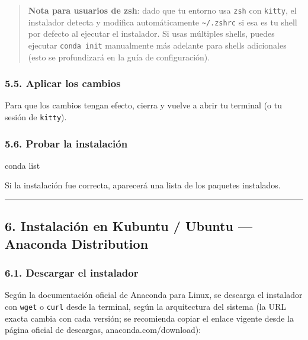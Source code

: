 \documentclass[
  doc,
  floatsintext,
  longtable,
  a4paper,
  nolmodern,
  notxfonts,
  notimes,
  12pt,
  colorlinks=true,linkcolor=blue,citecolor=blue,urlcolor=blue]{apa7}
\newenvironment{Shaded}{\begin{snugshade}}{\end{snugshade}}
\newcommand{\ExtensionTok}[1]{\textcolor[rgb]{0.00,0.23,0.31}{#1}}
\newcommand{\NormalTok}[1]{\textcolor[rgb]{0.00,0.23,0.31}{#1}}
\begin{document}
\begin{quote}
\textbf{Nota para usuarios de zsh}: dado que tu entorno usa \texttt{zsh}
con \texttt{kitty}, el instalador detecta y modifica automáticamente
\texttt{\textasciitilde{}/.zshrc} si esa es tu shell por defecto al
ejecutar el instalador. Si usas múltiples shells, puedes ejecutar
\texttt{conda\ init} manualmente más adelante para shells adicionales
(esto se profundizará en la guía de configuración).
\end{quote}

\subsubsection{5.5. Aplicar los cambios}\label{aplicar-los-cambios}

Para que los cambios tengan efecto, cierra y vuelve a abrir tu terminal
(o tu sesión de \texttt{kitty}).

\subsubsection{5.6. Probar la
instalación}\label{probar-la-instalaciuxf3n}

\begin{Shaded}
\begin{Highlighting}[]
\ExtensionTok{conda}\NormalTok{ list}
\end{Highlighting}
\end{Shaded}

Si la instalación fue correcta, aparecerá una lista de los paquetes
instalados.

\begin{center}\rule{0.5\linewidth}{0.5pt}\end{center}

\subsection{6. Instalación en Kubuntu / Ubuntu --- Anaconda
Distribution}\label{instalaciuxf3n-en-kubuntu-ubuntu-anaconda-distribution}

\subsubsection{6.1. Descargar el
instalador}\label{descargar-el-instalador-1}

Según la documentación oficial de Anaconda para Linux, se descarga el
instalador con \texttt{wget} o \texttt{curl} desde la terminal, según la
arquitectura del sistema (la URL exacta cambia con cada versión; se
recomienda copiar el enlace vigente desde la página oficial de
descargas, anaconda.com/download):
\end{document}
